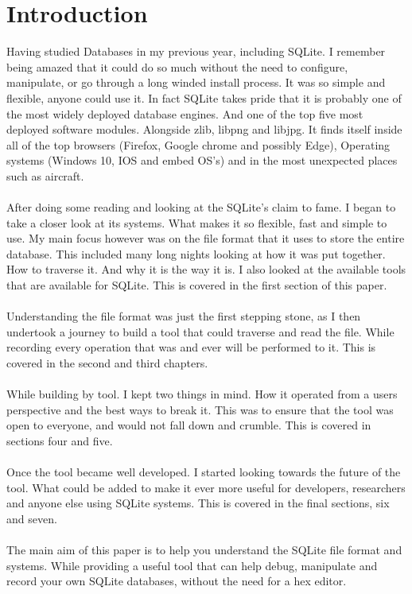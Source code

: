\section*{Introduction}
\label{sec:introduction}

Having studied Databases in my previous year, including SQLite. I remember being amazed that it could do so much without the need to configure, manipulate, or go through a long winded install process. It was so simple and flexible, anyone could use it. In fact SQLite takes pride that it is probably one of the most widely deployed database engines. And one of the top five most deployed software modules. Alongside zlib, libpng and libjpg. It finds itself inside all of the top browsers (Firefox, Google chrome and possibly Edge), Operating systems (Windows 10, IOS and embed OS's) and in the most unexpected places such as aircraft.
\\\\
After doing some reading and looking at the SQLite's claim to fame. I began to take a closer look at its systems. What makes it so flexible, fast and simple to use. My main focus however was on the file format that it uses to store the entire database. This included many long nights looking at how it was put together. How to traverse it. And why it is the way it is. I also looked at the available tools that are available for SQLite. This is covered in the first section of this paper.
\\\\
Understanding the file format was just the first stepping stone, as I then undertook a journey to build a tool that could traverse and read the file. While recording every operation that was and ever will be performed to it. This is covered in the second and third chapters.
\\\\
While building by tool. I kept two things in mind. How it operated from a users perspective and the best ways to break it. This was to ensure that the tool was open to everyone, and would not fall down and crumble. This is covered in sections four and five. 
\\\\
Once the tool became well developed. I started looking towards the future of the tool. What could be added to make it ever more useful for developers, researchers and anyone else using SQLite systems. This is covered in the final sections, six and seven.
\\\\
The main aim of this paper is to help you understand the SQLite file format and systems. While providing a useful tool that can help debug, manipulate and record your own SQLite databases, without the need for a hex editor.